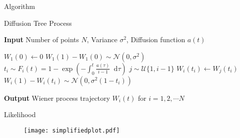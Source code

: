 \documentclass{beamer}
\newcommand*\diff{\mathop{}\!\mathrm{d}}
\begin{document}
	\begin{frame}{Algorithm}

		\begin{algorithm}[H]
\caption{Diffusion Tree Process}\label{DFT}
	\textbf{Input}   Number of points $N$, Variance $\sigma^2$, Diffusion function $a(t)$
	\begin{algorithmic}[1]
	    \State $W_{1}(0) \gets 0$
	    \State $W_{1}(1) - W_{1}(0) \sim \mathcal{N}(0, \sigma^2)$
	        \State $t_{i} \sim F_i(t) = 1-\exp(-\int_{0}^{t}\frac{a(\tau)}{i-1} \diff{\tau})$  
	        \State $j \sim \mathcal{U}\{1, i-1 \}$ 
	        \State $W_{i}(t_{i}) \gets W_{j}(t_{i})$
	        \State $W_{i}(1) - W_{i}(t_{i}) \sim \mathcal{N}(0, \sigma^2 (1-t_{i}))$
		\EndFor	
	\end{algorithmic}
	 \textbf{Output} Wiener process trajectory $W_{i}(t)$ for $i=1,2,\cdots N$
\end{algorithm}
	\end{frame}	
	
	\begin{frame}{Likelihood}
		\begin{figure}[htbp]
			\centering
			\texttt{[image: simplifiedplot.pdf]}
		\end{figure}
	\end{frame}	
	
\end{document}
